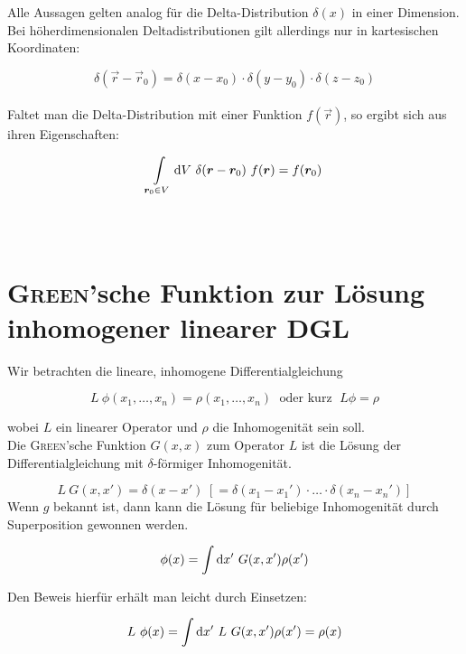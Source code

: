Alle Aussagen gelten analog für die Delta-Distribution $\delta(x)$ in einer Dimension.\\
Bei höherdimensionalen Deltadistributionen gilt allerdings nur in kartesischen Koordinaten:

\begin{equation*}
\delta(\vec{r} - \vec{r}_0) = \delta(x-x_0)\cdot\delta(y-y_0)\cdot\delta(z-z_0)
\end{equation*}
\ \\
Faltet man die Delta-Distribution mit einer Funktion $f(\vec{r})$, so ergibt sich aus ihren Eigenschaften:

\begin{equation*}
\int\limits_{\vec{r}_0\in V}\d V \ \delta({\vec{r}-\vec{r}_0}) \ f(\vec{r}) = f(\vec{r}_0)
\end{equation*}\\
\ \\

\section[\textsc{Green}'sche Funktion]{\textsc{Green}'sche Funktion zur Lösung inhomogener linearer DGL}

Wir betrachten die lineare, inhomogene Differentialgleichung

\begin{equation*}
L \ \phi (x_1,\dotsc,x_n) = \rho (x_1,\dotsc,x_n) \; \text{ oder kurz } \; L\phi = \rho
\end{equation*}

wobei $L$ ein linearer Operator und $\rho$ die Inhomogenität sein soll.\
\\
Die \textsc{Green}'sche Funktion $G(x,x)$ zum Operator $L$ ist die Lösung der Differentialgleichung mit $\delta$-förmiger Inhomogenität.

\begin{equation*}
L \ G(x,x') = \delta (x-x') \; [= \delta(x_1-x_1')\cdot\dotsc\cdot\delta(x_n - x_n')]
\end{equation*}
\newpage
Wenn $g$ bekannt ist, dann kann die Lösung für beliebige Inhomogenität durch Superposition gewonnen werden.

\begin{equation*}
\phi (x) = \int\mathrm{d} x' \ G(x,x') \rho(x')
\end{equation*}

Den Beweis hierfür erhält man leicht durch Einsetzen:

\begin{equation*}
L \ \phi(x) = \int\mathrm{d} x' \ L \ G(x,x') \rho(x') = \rho(x)
\end{equation*}

